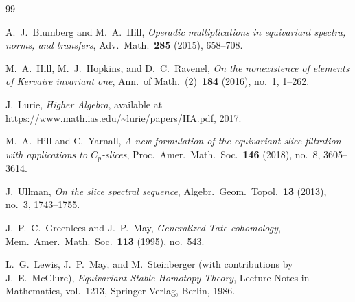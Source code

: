 \documentclass[12pt]{article}
\theoremstyle{definition}
\begin{document}
\begin{thebibliography}{99}

A.~J.~Blumberg and M.~A.~Hill,
\emph{Operadic multiplications in equivariant spectra, norms, and transfers},
Adv.\ Math.\ \textbf{285} (2015), 658--708.

M.~A.~Hill, M.~J.~Hopkins, and D.~C.~Ravenel,
\emph{On the nonexistence of elements of Kervaire invariant one},
Ann.\ of Math.\ (2)\ \textbf{184} (2016), no.~1, 1--262.

J.~Lurie,
\emph{Higher Algebra},
available at \url{https://www.math.ias.edu/~lurie/papers/HA.pdf}, 2017.

M.~A.~Hill and C.~Yarnall,
\emph{A new formulation of the equivariant slice filtration with applications to
$C_p$-slices},
Proc.\ Amer.\ Math.\ Soc.\ \textbf{146} (2018), no.~8, 3605--3614.

J.~Ullman,
\emph{On the slice spectral sequence},
Algebr.\ Geom.\ Topol.\ \textbf{13} (2013), no.~3, 1743--1755.

J.~P.~C.~Greenlees and J.~P.~May,
\emph{Generalized Tate cohomology},
Mem.\ Amer.\ Math.\ Soc.\ \textbf{113} (1995), no.~543.

L.~G.~Lewis, J.~P.~May, and M.~Steinberger (with contributions by J.~E.~McClure),
\emph{Equivariant Stable Homotopy Theory},
Lecture Notes in Mathematics, vol.~1213, Springer-Verlag, Berlin, 1986.

\end{thebibliography}
\end{document}
